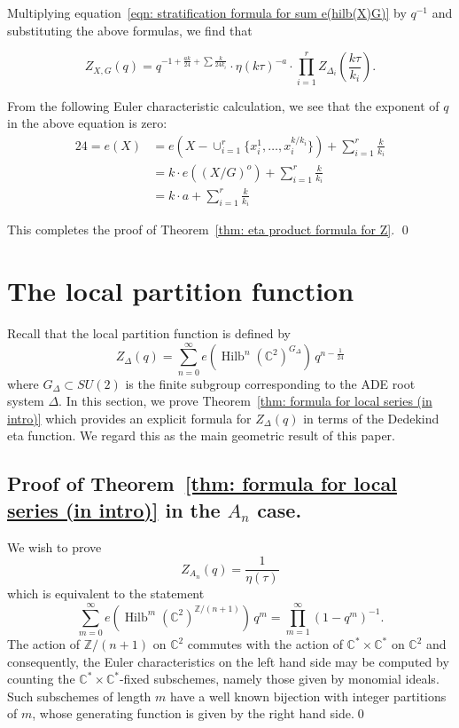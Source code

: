 \documentclass{amsart}
\theoremstyle{definition}
\newcommand{\CC} {{\mathbb C}}          %
\newcommand{\ZZ} {{\mathbb Z}}		%
\newcommand{\Hilb}{\operatorname{Hilb}}
\begin{document}
Multiplying equation~\eqref{eqn: stratification formula for sum
e(hilb(X)G)} by $q^{-1}$ and substituting the above formulas, we find
that

\[
Z_{X,G}(q) = q^{-1 +\frac{ak}{24} + \sum \frac{k}{24k_{i}} } \cdot 
\eta (k\tau )^{-a}\cdot 
\prod_{i=1}^{r}Z_{\Delta_{i}}\left(\frac{k\tau}{k_{i}} \right) .
\]

From the following Euler characteristic calculation, we see that the exponent of $q$ in the above equation is zero:
\begin{align*}
24 = e(X) &= e\left(X-\cup_{i=1}^{r} \{x_{i}^{1},\dotsc
,x_{i}^{k/k_{i}} \} \right) + \sum_{i=1}^{r} \frac{k}{k_{i}} \\
&= k \cdot e\left((X/G)^{o} \right) + \sum_{i=1}^{r} \frac{k}{k_{i}} \\
&= k\cdot a + \sum_{i=1}^{r}\frac{k}{k_{i}} 
\end{align*}

This completes the proof of Theorem~\ref{thm: eta product formula for
Z}.  \qed


\section{The local partition function}\label{sec: proof of formula for local series}


Recall that the local partition function is defined by
\[
Z_{\Delta} (q) = \sum_{n=0}^{\infty}
e\left(\Hilb^{n}(\CC^{2})^{G_{\Delta}} \right) \, q^{n-\frac{1}{24}} 
\]
where $G_{\Delta}\subset SU(2)$ is the finite subgroup corresponding
to the ADE root system $\Delta$. In this section, we prove
Theorem~\ref{thm: formula for local series (in intro)} which provides
an explicit formula for $Z_{\Delta}(q)$ in terms of the Dedekind eta
function.  We regard this as the main geometric result of this paper. 
 

\subsection{Proof of Theorem~\ref{thm: formula for local series (in
intro)} in the $A_{n}$ case.}\label{subsec: proof of An case of
local series}

We wish to prove
\[
Z_{A_{n}}(q) = \frac{1}{\eta (\tau )}
\]
which is equivalent to the statement
\[
\sum_{m=0}^{\infty} e\left(\Hilb^{m} (\CC^{2})^{\ZZ /(n+1)} \right)
\,q^{m} = \prod_{m=1}^{\infty} (1-q^{m})^{-1}.
\]
The action of $\ZZ /(n+1)$ on $\CC^{2}$ commutes with the action of
$\CC^{*}\times \CC^{*}$ on $\CC^{2}$ and consequently, the Euler
characteristics on the left hand side may be computed by counting
the $\CC^{*}\times \CC^{*}$-fixed subschemes, namely those given by
monomial ideals. Such subschemes of length $m$ have a well known
bijection with integer partitions of $m$, whose generating function is
given by the right hand side.\qed 
\end{document}

